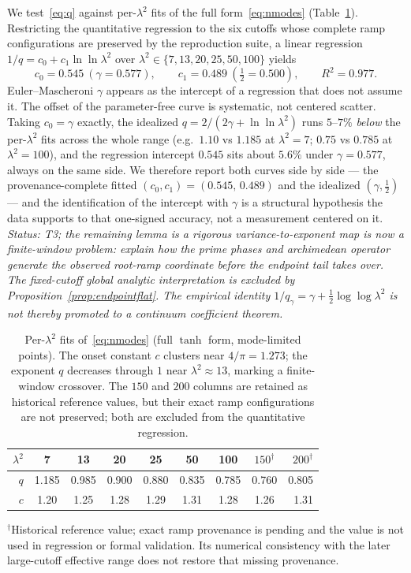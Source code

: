 \documentclass[11pt,a4paper]{article}
\begin{document}
We test~\eqref{eq:q} against per-$\lambda^2$ fits of the full
form~\eqref{eq:nmodes} (Table~\ref{tab:q}). Restricting the quantitative
regression to the six cutoffs whose complete ramp configurations are preserved
by the reproduction suite, a linear regression
$1/q=c_0+c_1\ln\ln\lambda^2$ over $\lambda^2\in\{7,13,20,25,50,100\}$ yields
\[
  c_0=0.545\ (\gamma=0.577),\qquad c_1=0.489\ (\tfrac12=0.500),
  \qquad R^2=0.977 .
\]
Euler--Mascheroni $\gamma$ appears as the intercept of a regression that does
not assume it. The
offset of the parameter-free curve is systematic, not centered scatter.
Taking $c_0=\gamma$ exactly,
the idealized $q=2/(2\gamma+\ln\ln\lambda^2)$ runs $5$--$7\%$ \emph{below} the
per-$\lambda^2$ fits across the whole range (e.g.\ $1.10$ vs $1.185$ at
$\lambda^2=7$; $0.75$ vs $0.785$ at $\lambda^2=100$), and the regression
intercept $0.545$ sits about $5.6\%$ under $\gamma=0.577$, always on the same side. We
therefore report both curves side by side --- the provenance-complete fitted
$(c_0,c_1)=(0.545,\,0.489)$ and the idealized
$(\gamma,\tfrac12)$ --- and the identification of the intercept with $\gamma$
is a structural hypothesis the data supports to that one-signed accuracy, not
a measurement centered on it. \emph{Status: T3; the remaining lemma is a rigorous
variance-to-exponent map is now a finite-window problem: explain how the
prime phases and archimedean operator generate the observed root-ramp
coordinate before the endpoint tail takes over. The fixed-cutoff global
analytic interpretation is excluded by Proposition~\ref{prop:endpointflat}.
The empirical identity $1/q_\gamma=\gamma+\tfrac12\log\log\lambda^2$ is
not thereby promoted to a continuum coefficient theorem.}

\begin{table}[t]
\centering
\caption{Per-$\lambda^2$ fits of~\eqref{eq:nmodes} (full $\tanh$ form,
mode-limited points). The onset constant $c$ clusters near $4/\pi=1.273$; the
exponent $q$ decreases through $1$ near $\lambda^2\approx13$, marking a
finite-window crossover. The $150$ and $200$ columns are retained as historical
reference values, but their exact ramp configurations are not preserved; both
are excluded from the quantitative regression.}
\label{tab:q}
\begin{tabular}{@{}rccccccc r@{}}
\toprule
$\lambda^2$ & 7 & 13 & 20 & 25 & 50 & 100 & $150^\dagger$ & $200^\dagger$ \\
\midrule
$q$ & 1.185 & 0.985 & 0.900 & 0.880 & 0.835 & 0.785 & 0.760 & 0.805 \\
$c$ & 1.20 & 1.25 & 1.28 & 1.29 & 1.31 & 1.28 & 1.26 & 1.31 \\
\bottomrule
\end{tabular}
\par\smallskip
{\footnotesize $^\dagger$Historical reference value; exact ramp provenance
is pending and the value is not used in regression or formal validation.
Its numerical consistency with the later large-cutoff effective range does not
restore that missing provenance.}
\end{table}
\end{document}

